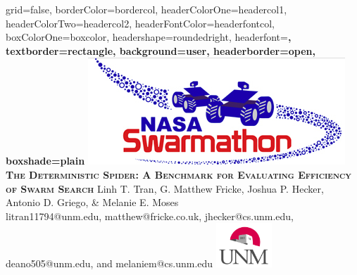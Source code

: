 \documentclass[a0paper,portrait,colspacing]{baposter}
\begin{document}
\begin{poster}{
grid=false,
borderColor=bordercol, %
headerColorOne=headercol1, %
headerColorTwo=headercol2, %
headerFontColor=headerfontcol, %
boxColorOne=boxcolor, %
headershape=roundedright, %
headerfont=\Large\sf\bf, %
textborder=rectangle,
background=user,
headerborder=open, %
boxshade=plain
}
{\includegraphics[scale=0.20]{SwarmathonLogo.png}}  %
%
%
{\sf\bf\textsc{The Deterministic Spider: A Benchmark for Evaluating Efficiency of Swarm Search}} %
{Linh T. Tran, G. Matthew Fricke, Joshua P. Hecker, Antonio D. Griego, \& Melanie E. Moses\\ %
{\smaller litran11794@unm.edu, matthew@fricke.co.uk, jhecker@cs.unm.edu, deano505@unm.edu, and melaniem@cs.unm.edu}} %
{\includegraphics[height=4.5em]{UNMLogoVertColor.jpg}} %



\end{poster}
\end{document}
